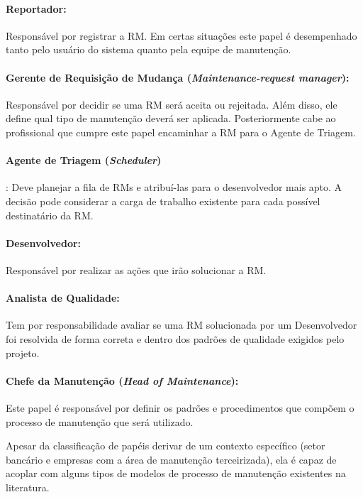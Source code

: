 \paragraph{Reportador:}
Responsável por registrar a RM\@. Em certas situações este papel é desempenhado
tanto pelo usuário do sistema quanto pela equipe de manutenção.

\paragraph{Gerente de Requisição de Mudança (\textit{Maintenance-request
        manager}):} Res\-pon\-sá\-vel por decidir se uma RM será aceita ou
rejeitada. Além disso, ele define qual tipo de manutenção deverá ser aplicada.
Posteriormente cabe ao profissional que cumpre este papel encaminhar a RM para
o Agente de Triagem.

\paragraph{Agente de Triagem (\textit{Scheduler})}:
Deve planejar a fila de RMs e atribuí-las para o desenvolvedor mais apto. A
decisão pode considerar a carga de trabalho existente para cada possível
destinatário da RM\@.

\paragraph{Desenvolvedor:}
Responsável por realizar as ações que irão solucionar a RM\@.

\paragraph{Analista de Qualidade:}
Tem por responsabilidade avaliar se uma RM solucionada por um Desenvolvedor foi
resolvida de forma correta e dentro dos padrões de qualidade exigidos pelo
projeto.

\paragraph{Chefe da Manutenção (\textit{Head of	Maintenance}):}
Este papel é responsável por definir os padrões e procedimentos que compõem o
processo de manutenção que será utilizado.

Apesar da classificação de papéis derivar de um contexto específico (setor
bancário e empresas com a área de manutenção terceirizada), ela é capaz de
acoplar com alguns tipos de modelos de processo de manutenção existentes na
literatura.

